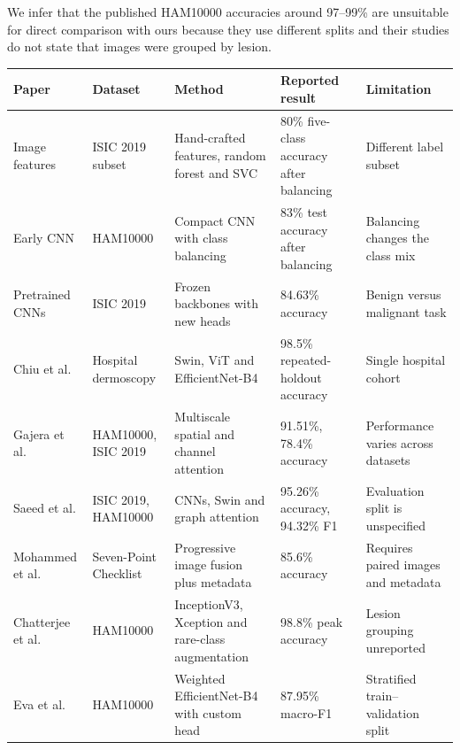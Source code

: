 \documentclass[11pt,a4paper]{article}
\renewcommand{\arraystretch}{1.19}
\begin{document}
We infer that the published HAM10000 accuracies around 97--99\% are unsuitable for direct comparison with ours because they use different splits and their studies do not state that images were grouped by lesion.
\endgroup
\par\medskip
\begin{minipage}{\linewidth}
\centering
{}
\label{tab:survey}
\footnotesize
\setlength{\tabcolsep}{4pt}
\renewcommand{\arraystretch}{1.11}
\begin{tabularx}{\textwidth}{@{}L{.145\textwidth}L{.159\textwidth}L{.18\textwidth}L{.165\textwidth}Y@{}}
\toprule
Paper & Dataset & Method & Reported result & Limitation \\
\midrule
Image features \citep{surveyFeatures} & ISIC 2019 subset & Hand-crafted features, random forest and SVC & 80\% five-class accuracy after balancing & Different label subset \\
Early CNN \citep{surveyEarlyCNN} & HAM10000 & Compact CNN with class balancing & 83\% test accuracy after balancing & Balancing changes the class mix \\
Pretrained CNNs \citep{surveyPretrained} & ISIC 2019 & Frozen backbones with new heads & 84.63\% accuracy & Benign versus malignant task \\
Chiu et al. \citep{surveyChiu} & Hospital dermoscopy & Swin, ViT and EfficientNet-B4 & 98.5\% repeated-holdout accuracy & Single hospital cohort \\
Gajera et al. \citep{surveyGajera} & HAM10000, ISIC 2019 & Multiscale spatial and channel attention & 91.51\%, 78.4\% accuracy & Performance varies across datasets \\
Saeed et al. \citep{surveySaeed} & ISIC 2019, HAM10000 & CNNs, Swin and graph attention & 95.26\% accuracy, 94.32\% F1 & Evaluation split is unspecified \\
Mohammed et al. \citep{surveyMohammed} & Seven-Point Checklist & Progressive image fusion plus metadata & 85.6\% accuracy & Requires paired images and metadata \\
Chatterjee et al. \citep{surveyChatterjee} & HAM10000 & InceptionV3, Xception and rare-class augmentation & 98.8\% peak accuracy & Lesion grouping unreported \\
Eva et al. \citep{surveyEva} & HAM10000 & Weighted EfficientNet-B4 with custom head & 87.95\% macro-F1 & Stratified train--validation split \\

\end{tabularx}
\end{minipage}
\end{document}
